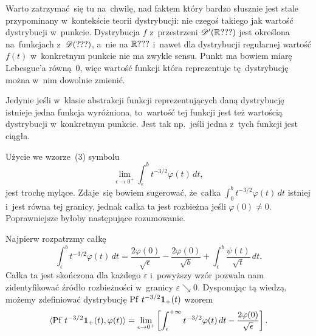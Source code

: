 \documentclass[a4paper,11pt]{article}
\begin{document}
\start {} Warto zatrzymać~się tu na~chwilę, nad faktem który
bardzo słusznie jest stale przypominany w~kontekście teorii
dystrybucji: nie czegoś takiego jak wartość dystrybucji w~punkcie.
Dystrybucja $f$ z~przestrzeni $\mathcal{D}'( \mathbb{R} ??? )$ jest określona
na~funkcjach z~$\mathcal{D}( ??? )$, a~nie na $\mathbb{R} ???$ i~nawet dla dystrybucji
regularnej wartość $f( t )$ w~konkretnym punkcie nie ma zwykle sensu.
Punkt ma bowiem miarę Lebesgue’a równą~0, więc wartość funkcji która
reprezentuje tę~dystrybucję można w~nim dowolnie zmienić.

Jedynie jeśli w~klasie abstrakcji funkcji reprezentujących daną
dystrybucję istnieje jedna funkcja wyróżniona, to~wartość tej funkcji
jest też wartością dystrybucji w~konkretnym punkcie. Jest tak
np.~jeśli jedna z~tych funkcji jest ciągła.

\vspace{\spaceFour}



\start {} Użycie we wzorze~(3) symbolu
\begin{equation}
  \label{eq:Zem-s01-01}
  \lim_{ \epsilon \to 0^{ + } } \int_{ \epsilon }^{ b } t^{ -3 / 2 } \varphi( t ) \, dt,
\end{equation}
jest trochę mylące. Zdaje~się bowiem sugerować, że~całka
$\int_{ 0 }^{ b } t^{ -3 / 2 } \varphi( t ) \, dt$ istniej i~jest równa tej
granicy, jednak całka ta jest rozbieżna jeśli $\varphi( 0 ) \neq 0$.
Poprawniejsze byłoby następujące rozumowanie.

Najpierw rozpatrzmy całkę
\begin{equation}
  \label{eq:Zem-s01-02}
  \int_{ \epsilon }^{ b } t^{ -3/2 } \varphi( t ) \, dt
  =
  \frac{ 2 \varphi( 0 ) }{ \sqrt{ \epsilon } } - \frac{ 2 \varphi( 0 ) }{ \sqrt{ b } }
  + \int_{ \epsilon }^{ b } \frac{ \psi( t ) }{ \sqrt{ t } } \, dt.
\end{equation}
Całka ta jest skończona dla każdego $\varepsilon$ i~powyższy wzór pozwala
nam zidentyfikować źródło rozbieżności w~granicy $\varepsilon \searrow 0$.
Dysponując tą wiedzą, możemy zdefiniować dystrybucję
$\mathrm{Pf}\, \, t^{ -3 / 2 } \mathbf{1}_{ + }( t )$ wzorem
\begin{equation}
  \label{eq:Zem-s01-03}
  \langle \mathrm{Pf}\, \, t^{ -3/2 } \mathbf{1}_{ + }( t ), \varphi( t ) \rangle
  =
  \lim_{ \epsilon \to 0^{ + } } \left[ \int_{ \epsilon }^{ +\infty } t^{ -3/2 } \varphi( t ) \, dt
    - \frac{ 2 \varphi( 0 ) }{ \sqrt{ \epsilon } } \right].
\end{equation}
\end{document}
